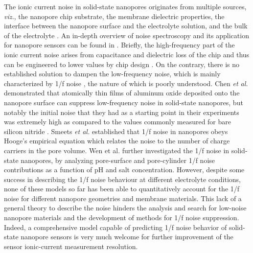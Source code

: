 The ionic current noise in solid-state nanopores originates from multiple sources, \emph{viz.}, the nanopore chip substrate, the membrane dielectric properties, the interface between the nanopore surface and the electrolyte solution, and the bulk of the electrolyte \cite{Uram2008,Smeets2008}. An in-depth overview of noise spectroscopy and its application for nanopore sensors can be found in \cite{Roelen2018,DeFelice1981}. Briefly, the high-frequency part of the ionic current noise arises from capacitance and dielectric loss of the chip \cite{Tabard-Cossa2007} and thus can be engineered to lower values by chip design \cite{Tabard-Cossa2007,Balan2015,Park2016}. On the contrary, there is no established solution to dampen the low-frequency noise, which is mainly characterized by 1/f noise \cite{Smeets2008}, the nature of which is poorly understood. Chen \emph{et al.} \cite{Chen2004} demonstrated that atomically thin films of aluminum oxide deposited onto the nanopore surface  can suppress low-frequency noise in solid-state nanopores, but notably the initial noise that they had as a starting point in their experiments was extremely high as compared to the values commonly measured for bare silicon nitride \cite{Smeets2008,Balan2015}. Smeets \emph{et al.}\cite{Smeets2008} established that 1/f noise in nanopores obeys Hooge's empirical equation which relates the noise to the number of charge carriers in the pore volume. Wen et al. \cite{Wen2017} further investigated the 1/f noise in solid-state nanopores, by analyzing pore-surface and pore-cylinder 1/f noise contributions as a function of pH and salt concentration. However, despite some success in describing the 1/f noise behaviour at different electrolyte conditions, none of these models so far has been able to quantitatively account for the 1/f noise for different nanopore geometries and membrane materials. This lack of a general theory to describe the noise hinders the analysis and search for low-noise nanopore materials and the development of methods for 1/f noise suppression. Indeed, a comprehensive model capable of predicting 1/f noise behavior of solid-state nanopore sensors is very much welcome for further improvement of the sensor ionic-current measurement resolution.


